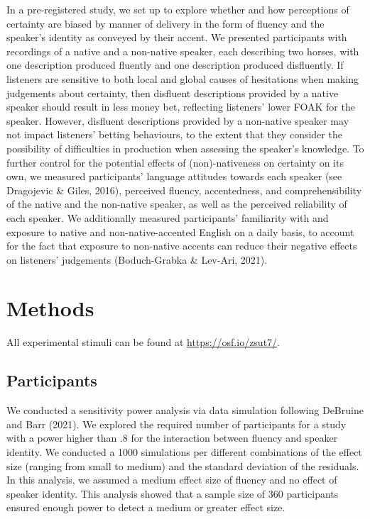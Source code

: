 \documentclass[
  man,floatsintext]{apa7}
\begin{document}
In a pre-registered study, we set up to explore whether and how perceptions of certainty are biased by manner of delivery in the form of fluency and the speaker's identity as conveyed by their accent. We presented participants with recordings of a native and a non-native speaker, each describing two horses, with one description produced fluently and one description produced disfluently. If listeners are sensitive to both local and global causes of hesitations when making judgements about certainty, then disfluent descriptions provided by a native speaker should result in less money bet, reflecting listeners' lower FOAK for the speaker. However, disfluent descriptions provided by a non-native speaker may not impact listeners' betting behaviours, to the extent that they consider the possibility of difficulties in production when assessing the speaker's knowledge. To further control for the potential effects of (non)-nativeness on certainty on its own, we measured participants' language attitudes towards each speaker (see Dragojevic \& Giles, 2016), perceived fluency, accentedness, and comprehensibility of the native and the non-native speaker, as well as the perceived reliability of each speaker. We additionally measured participants' familiarity with and exposure to native and non-native-accented English on a daily basis, to account for the fact that exposure to non-native accents can reduce their negative effects on listeners' judgements (Boduch-Grabka \& Lev-Ari, 2021).

\hypertarget{methods}{%
\section{Methods}\label{methods}}

All experimental stimuli can be found at \url{https://osf.io/zsut7/}.

\hypertarget{participants}{%
\subsection{Participants}\label{participants}}

We conducted a sensitivity power analysis via data simulation following DeBruine and Barr (2021). We explored the required number of participants for a study with a power higher than .8 for the interaction between fluency and speaker identity. We conducted a 1000 simulations per different combinations of the effect size (ranging from small to medium) and the standard deviation of the residuals. In this analysis, we assumed a medium effect size of fluency and no effect of speaker identity. This analysis showed that a sample size of 360 participants ensured enough power to detect a medium or greater effect size.
\end{document}

